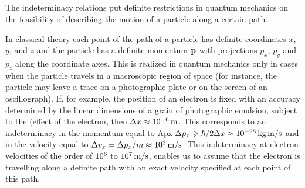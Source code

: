 \subsection{}\label{58.6.3} The indeterminacy relations put definite restrictions in quantum mechanics on the feasibility of describing the motion of a particle along a certain path. 

In classical theory each point of the path of a particle has definite coordinates $x$, $y$, and $z$ and the particle has a definite momentum $\vb{p}$ with projections $p_{x}$, $p_{y}$ and $p_{z}$ along the coordinate axes. This is realized in quantum mechanics only in cases when the particle travels in a macroscopic region of space (for instance, the particle may leave a trace on a photographic plate or on the screen of an oscillograph). If, for example, the position of an electron is fixed with an accuracy determined by the linear dimensions of a grain of photographic emulsion, subject to the (effect of the electron, then $\Delta x \approx \SI{d-6}{\meter}$. This corresponds to an indeterminacy in the momentum equal to Apx $\Delta p_{x} \geqslant \hbar/2 \Delta x \approx \SI{d-28}{\kilo\gram\meter\per\second}$ and in the velocity equal to $\Delta v_{x} = \Delta p_{x}/m \approx \SI{d2}{\meter\per\second}$. This indeterminacy at electron velocities of the order of $\num{d6}$ to $\SI{d7}{\meter\per\second}$, enables us to assume that the electron is travelling along a definite path with an exact velocity specified at each point of this path.

